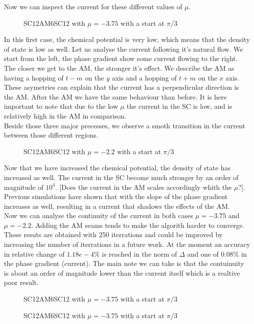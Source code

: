 \documentclass[../main.tex]{subfiles}
\begin{document}
Now we can inspect the current for these different values of $\mu$. 
\begin{figure}[H]
    \centering
    
    \caption{SC12AM6SC12 with $\mu=-3.75$ with a start at $\pi/3$}
\end{figure}
In this first case, the chemical potential is very low, which means that the density of state is low as well. Let us analyse the current following it's natural flow.
We start from the left, the phase gradient show some current flowing to the right. The closer we get to the AM, the stronger it's effect. We describe the AM as having
a hopping of $t-m$ on the $y$ axis and a hopping of $t+m$ on the $x$ axis. These asymetries can explain that the current has a perpendicular direction is the AM. 
After the AM we have the same behaviour than before. It is here important to note that due to the low $\mu$ the current in the SC is low, and is relatively high in the AM in comparison.\\
Beside those three major precesses, we observe a smoth transition in the current between those different regions. 
\begin{figure}[H]
    \centering
    
    \caption{SC12AM6SC12 with $\mu=-2.2$ with a start at $\pi/3$}
\end{figure}
Now that we have increased the chemical potential, the density of state has increased as well. The current in the SC become much stronger by an order of magnitude of $10^4$. 
[Does the current in the AM scales accordingly whith the $\mu$?]. Previous simulations have shown that with the slope of the phase gradient increases as well, resulting 
in a current that shadows the effects of the AM.\\

Now we can analyse the continuity of the current in both cases $\mu=-3.75$ and $\mu=-2.2$. Adding the AM seams tends to make the algorith harder to converge. These resuts are obtained
with 250 iterrations and could be improved by increasing the number of iterrations in a future work. At the moment an accuracy in relative change of $1.18e-4\%$ is reached in the norm of $\Delta$ 
and one of $0.08\%$ in the phase gradient (current). The main note we can take is that the contuinuity is about an order of magnitude lower
than the current itself which is a realtive poor result.
\begin{figure}[H]
    \centering
    
    \caption{SC12AM6SC12 with $\mu=-3.75$ with a start at $\pi/3$}
\end{figure}
\begin{figure}[H]
    \centering
    
    \caption{SC12AM6SC12 with $\mu=-3.75$ with a start at $\pi/3$}
\end{figure}
\end{document}
